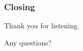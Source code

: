 \documentclass[
	12pt, %
	aspectratio=169, %
]{beamer}
\begin{document}
\begin{frame}
	\begin{center}
		\frametitle{Closing}
		{\Huge Thank you for listening.}
		
		\bigskip\bigskip
		
		{\LARGE Any questions?} 
	\end{center}
\end{frame}


%
\end{document}
